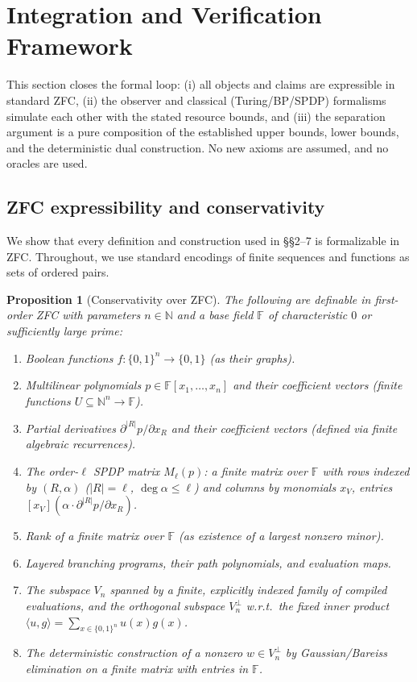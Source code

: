 \documentclass[12pt]{article}
\newtheorem{proposition}[theorem]{Proposition}
\theoremstyle{definition}
\theoremstyle{definition}
\theoremstyle{remark}
\theoremstyle{remark}
\begin{document}
\section{Integration and Verification Framework}
\label{sec:integration}

This section closes the formal loop: (i) all objects and claims are expressible in standard ZFC, (ii) the observer and classical (Turing/BP/SPDP) formalisms simulate each other with the stated resource bounds, and (iii) the separation argument is a pure composition of the established upper bounds, lower bounds, and the deterministic dual construction. No new axioms are assumed, and no oracles are used.

\subsection{ZFC expressibility and conservativity}

We show that every definition and construction used in \S\S2--7 is formalizable in ZFC. Throughout, we use standard encodings of finite sequences and functions as sets of ordered pairs.

\begin{proposition}[Conservativity over ZFC]\label{prop:zfc-conservativity}
The following are definable in first-order ZFC with parameters $n\in\mathbb{N}$ and a base field $\mathbb{F}$ of characteristic $0$ or sufficiently large prime:
\begin{enumerate}
\item Boolean functions $f:\{0,1\}^n\to\{0,1\}$ (as their graphs).
\item Multilinear polynomials $p\in\mathbb{F}[x_1,\dots,x_n]$ and their coefficient vectors (finite functions $U\subseteq\mathbb{N}^n\to\mathbb{F}$).
\item Partial derivatives $\partial^{|R|}p/\partial x_R$ and their coefficient vectors (defined via finite algebraic recurrences).
\item The order-$\ell$ SPDP matrix $M_\ell(p)$: a finite matrix over $\mathbb{F}$ with rows indexed by $(R,\alpha)$ ($|R|=\ell$, $\deg\alpha\le\ell$) and columns by monomials $x_V$, entries $[x_V](\alpha\cdot\partial^{|R|}p/\partial x_R)$.
\item Rank of a finite matrix over $\mathbb{F}$ (as existence of a largest nonzero minor).
\item Layered branching programs, their path polynomials, and evaluation maps.
\item The subspace $V_n$ spanned by a finite, explicitly indexed family of compiled evaluations, and the orthogonal subspace $V_n^{\perp}$ w.r.t.\ the fixed inner product $\langle u, g\rangle = \sum_{x\in\{0,1\}^n} u(x)g(x)$.
\item The deterministic construction of a nonzero $w\in V_n^{\perp}$ by Gaussian/Bareiss elimination on a finite matrix with entries in $\mathbb{F}$.
\end{enumerate}
\end{proposition}
\end{document}
